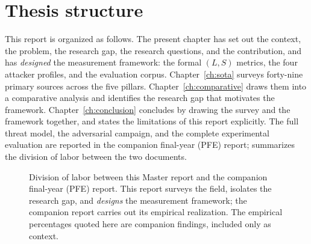\documentclass[12pt,a4paper]{report}
\begin{document}
\section{Thesis structure}
\label{sec:intro-structure}

This report is organized as follows. The present chapter has set out the context, the problem,
the research gap, the research questions, and the contribution, and has \emph{designed} the
measurement framework: the formal $(L,S)$ metrics, the four attacker profiles, and the evaluation
corpus. Chapter~\ref{ch:sota} surveys forty-nine primary sources across the five pillars.
Chapter~\ref{ch:comparative} draws them into a comparative analysis and identifies the research gap
that motivates the framework. Chapter~\ref{ch:conclusion} concludes by drawing the survey and the
framework together, and states the limitations of this report explicitly. The full threat model, the
adversarial campaign, and the complete experimental evaluation are reported in the companion
final-year (PFE) report;  summarizes the division of labor between the two
documents.

\begin{figure}[H]
\centering
{}
\caption[Division of labor between the two reports]{Division of labor between this Master report
and the companion final-year (PFE) report. This report surveys the field, isolates the research gap,
and \emph{designs} the measurement framework; the companion report carries out its empirical
realization. The empirical percentages quoted here are companion findings, included only as context.}
\label{fig:m-scope}
\end{figure}
\end{document}
